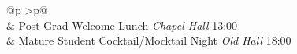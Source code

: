 \documentclass[a4paper,12pt]{article}
\begin{document}
\begin{center}
\begin{tabular}{@{}p{\colA} >{\raggedleft\arraybackslash}p{\colB}@{}}
    \\[0.25em]
      & Post Grad Welcome Lunch \hspace{0.5em} \emph{Chapel Hall} \hspace{0.5em} 13:00 \\
      & Mature Student Cocktail/Mocktail Night \hspace{0.5em} \emph{Old Hall} \hspace{0.5em} 18:00 \\
    \end{tabular}


\end{center}
\end{document}
